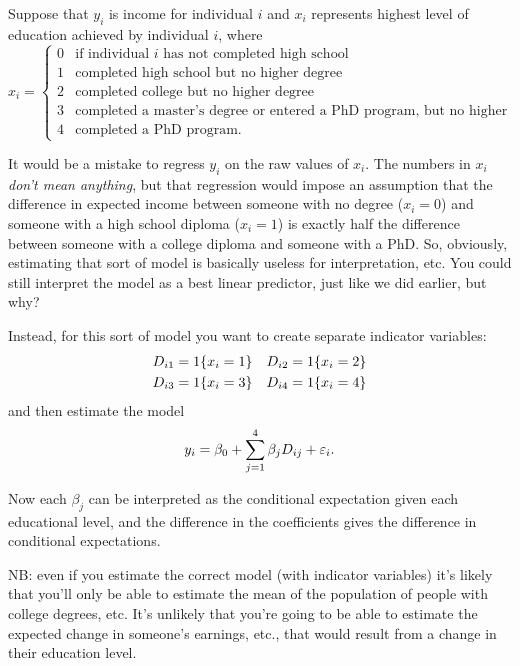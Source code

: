 \begin{itemize}[leftmargin=0pt]
  \begin{ex}
    Suppose that $y_i$ is income for individual $i$ and $x_i$
    represents highest level of education achieved by individual $i$,
    where
    \begin{equation*}
      x_i =
      \begin{cases}
        0 & \text{if individual $i$ has not completed high school} \\
        1 & \text{completed high school but no higher degree} \\
        2 & \text{completed college but no higher degree} \\
        3 & \text{completed a master's degree or entered a PhD
          program, but no higher degree} \\
        4 & \text{completed a PhD program}.
      \end{cases}
    \end{equation*}

    It would be a mistake to regress $y_i$ on the raw values of $x_i$.
    The numbers in $x_i$ \emph{don't mean anything}, but that
    regression would impose an assumption that the difference in
    expected income between someone with no degree ($x_i = 0$) and
    someone with a high school diploma ($x_i = 1$) is exactly half the
    difference between someone with a college diploma and someone with
    a PhD.  So, obviously, estimating that sort of model is basically
    useless for interpretation, etc.  You could still interpret the
    model as a best linear predictor, just like we did earlier, but
    why?

    Instead, for this sort of model you want to create separate
    indicator variables:
    \begin{align*}
      D_{i1} &= \operatorname{1}\{x_i = 1\} &
      D_{i2} &= \operatorname{1}\{x_i = 2\} \\
      D_{i3} &= \operatorname{1}\{x_i = 3\} &
      D_{i4} &= \operatorname{1}\{x_i = 4\}
    \end{align*}
    and then estimate the model
    \begin{equation*}
      y_i = \beta_0 + \sum_{j=1}^4 \beta_j D_{ij} + \varepsilon_i.
    \end{equation*}
    
    Now each $\beta_j$ can be interpreted as the conditional
    expectation given each educational level, and the difference in
    the coefficients gives the difference in conditional expectations.
  \end{ex}

  NB: even if you estimate the correct model (with indicator
  variables) it's likely that you'll only be able to estimate the mean
  of the population of people with college degrees, etc.  It's
  unlikely that you're going to be able to estimate the expected
  change in someone's earnings, etc., that would result from a change
  in their education level.
  
\end{itemize}

